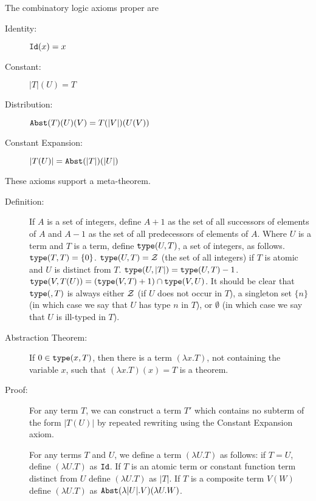 \documentclass[12pt]{article}
\begin{document}
The combinatory logic axioms proper are

\begin{description}

\item[Identity:] ${\tt Id}(x)=x$

\item[Constant:] $|T|(U) = T$

\item[Distribution:] ${\tt Abst}(T)(U)(V) = T(|V|)(U(V))$

\item[Constant Expansion:]  $|T(U)| = {\tt Abst}(|T|)(|U|)$

\end{description}

These axioms support a meta-theorem.

\begin{description}

\item[Definition:] If $A$ is a set of integers, define $A+1$ as the
set of all successors of elements of $A$ and $A-1$ as the set of all
predecessors of elements of $A$.  Where $U$ is a term and $T$ is a
term, define ${\tt type}(U,T)$, a set of integers, as follows.  ${\tt
type}(T,T)=\{0\}$.  ${\tt type}(U,T) = {\cal Z}$ (the set of all
integers) if $T$ is atomic and $U$ is distinct from $T$.  ${\tt
type}(U,|T|) = {\tt type}(U,T)-1$.  ${\tt type}(V,T(U)) = ({\tt
type}(V,T)+1) \cap {\tt type}(V,U)$.  It should be clear that ${\tt
type}(,T)$ is always either $\cal Z$ (if $U$ does not occur in $T$),
a singleton set $\{n\}$ (in which case we say that $U$ has type $n$ in
$T$), or $\emptyset$ (in which case we say that $U$ is ill-typed in
$T$).

\item[Abstraction Theorem:] If $0 \in {\tt type}(x,T)$, then there is
a term $(\lambda x.T)$, not containing the variable $x$, such that
$(\lambda x.T)(x) = T$ is a theorem.

\item[Proof:] For any term $T$, we can construct a term $T'$ which
contains no subterm of the form $|T(U)|$ by repeated rewriting using
the Constant Expansion axiom.

For any terms $T$ and $U$, we define a term $(\lambda U.T)$ as
follows: if $T=U$, define $(\lambda U.T)$ as ${\tt Id}$.  If $T$ is an
atomic term or constant function term distinct from $U$ define
$(\lambda U.T)$ as $|T|$.  If $T$ is a composite term $V(W)$ define
$(\lambda U.T)$ as ${\tt Abst}(\lambda |U|.V)(\lambda U.W)$.


\end{description}
\end{document}
